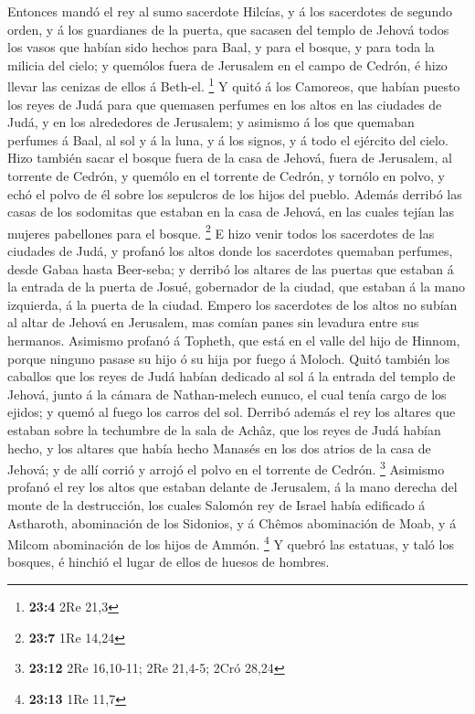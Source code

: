  Entonces mandó el rey al sumo sacerdote Hilcías, y á los
sacerdotes de segundo orden, y á los guardianes de la puerta, que
sacasen del templo de Jehová todos los vasos que habían sido hechos para
Baal, y para el bosque, y para toda la milicia del cielo; y quemólos
fuera de Jerusalem en el campo de Cedrón, é hizo llevar las cenizas de
ellos á Beth-el. \footnote{\textbf{23:4} 2Re 21,3}  Y quitó
á los Camoreos, que habían puesto los reyes de Judá para que quemasen
perfumes en los altos en las ciudades de Judá, y en los alrededores de
Jerusalem; y asimismo á los que quemaban perfumes á Baal, al sol y á la
luna, y á los signos, y á todo el ejército del cielo.  Hizo
también sacar el bosque fuera de la casa de Jehová, fuera de Jerusalem,
al torrente de Cedrón, y quemólo en el torrente de Cedrón, y tornólo en
polvo, y echó el polvo de él sobre los sepulcros de los hijos del
pueblo.  Además derribó las casas de los sodomitas que
estaban en la casa de Jehová, en las cuales tejían las mujeres
pabellones para el bosque. \footnote{\textbf{23:7} 1Re 14,24}
 E hizo venir todos los sacerdotes de las ciudades de Judá,
y profanó los altos donde los sacerdotes quemaban perfumes, desde Gabaa
hasta Beer-seba; y derribó los altares de las puertas que estaban á la
entrada de la puerta de Josué, gobernador de la ciudad, que estaban á la
mano izquierda, á la puerta de la ciudad.  Empero los
sacerdotes de los altos no subían al altar de Jehová en Jerusalem, mas
comían panes sin levadura entre sus hermanos.  Asimismo
profanó á Topheth, que está en el valle del hijo de Hinnom, porque
ninguno pasase su hijo ó su hija por fuego á Moloch.  Quitó
también los caballos que los reyes de Judá habían dedicado al sol á la
entrada del templo de Jehová, junto á la cámara de Nathan-melech eunuco,
el cual tenía cargo de los ejidos; y quemó al fuego los carros del sol.
 Derribó además el rey los altares que estaban sobre la
techumbre de la sala de Achâz, que los reyes de Judá habían hecho, y los
altares que había hecho Manasés en los dos atrios de la casa de Jehová;
y de allí corrió y arrojó el polvo en el torrente de Cedrón. \footnote{\textbf{23:12}
  2Re 16,10-11; 2Re 21,4-5; 2Cró 28,24}  Asimismo profanó
el rey los altos que estaban delante de Jerusalem, á la mano derecha del
monte de la destrucción, los cuales Salomón rey de Israel había
edificado á Astharoth, abominación de los Sidonios, y á Chêmos
abominación de Moab, y á Milcom abominación de los hijos de Ammón.
\footnote{\textbf{23:13} 1Re 11,7}  Y quebró las estatuas,
y taló los bosques, é hinchió el lugar de ellos de huesos de hombres.

